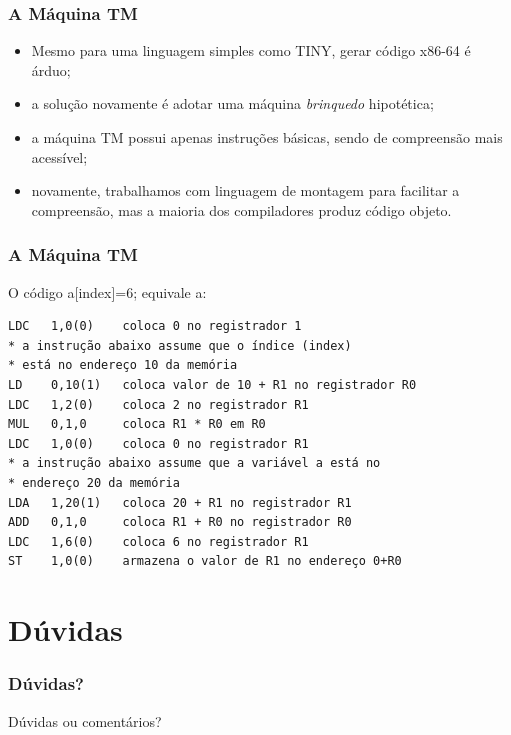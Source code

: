 \documentclass[table]{beamer}
\begin{document}
\begin{frame}
   \frametitle{A Máquina TM}
   \begin{itemize}
      \item Mesmo para uma linguagem simples como TINY, gerar código x86-64 é árduo;
      \item a solução novamente é adotar uma máquina \textit{brinquedo} hipotética;
      \item a máquina TM possui apenas instruções básicas, sendo de compreensão mais acessível;
      \item novamente, trabalhamos com linguagem de montagem para facilitar a compreensão, mas a maioria dos compiladores produz código objeto.
   \end{itemize}
\end{frame}

\begin{frame}[fragile]
   \frametitle{A Máquina TM}
   O código  a[index]=6; equivale a:
   \footnotesize
   \begin{verbatim}
LDC   1,0(0)    coloca 0 no registrador 1
* a instrução abaixo assume que o índice (index)
* está no endereço 10 da memória
LD    0,10(1)   coloca valor de 10 + R1 no registrador R0
LDC   1,2(0)    coloca 2 no registrador R1
MUL   0,1,0     coloca R1 * R0 em R0
LDC   1,0(0)    coloca 0 no registrador R1 
* a instrução abaixo assume que a variável a está no
* endereço 20 da memória
LDA   1,20(1)   coloca 20 + R1 no registrador R1
ADD   0,1,0     coloca R1 + R0 no registrador R0
LDC   1,6(0)    coloca 6 no registrador R1
ST    1,0(0)    armazena o valor de R1 no endereço 0+R0
   \end{verbatim}
\end{frame}

\section*{Dúvidas}
\begin{frame}
   \frametitle{Dúvidas?}
   Dúvidas ou comentários?
\end{frame}
\end{document}
